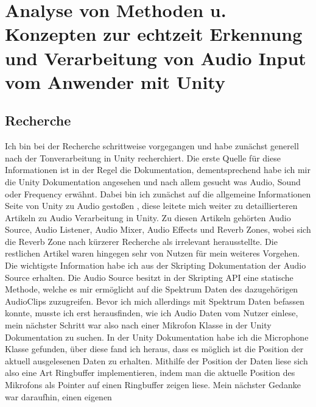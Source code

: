 \section{Analyse von Methoden u. Konzepten zur echtzeit Erkennung und Verarbeitung von Audio Input vom Anwender mit Unity}

\subsection{Recherche}
Ich bin bei der Recherche schrittweise vorgegangen und habe zunächst generell nach der Tonverarbeitung in Unity recherchiert. Die erste Quelle für diese Informationen ist in der Regel die Dokumentation, dementsprechend habe ich mir
die Unity Dokumentation angesehen und nach allem gesucht was Audio, Sound oder Frequency erwähnt. Dabei bin ich zunächst auf die allgemeine Informationen Seite von Unity zu Audio gestoßen \cite{unity_doku_audio}, diese leitete mich weiter zu detaillierteren Artikeln zu Audio Verarbeitung in Unity.
Zu diesen Artikeln gehörten Audio Source, Audio Listener, Audio Mixer, Audio Effects und Reverb Zones, wobei sich die Reverb Zone nach kürzerer
Recherche als irrelevant herausstellte. Die restlichen Artikel waren hingegen sehr von Nutzen für mein weiteres Vorgehen. Die wichtigste Information habe ich aus der Skripting Dokumentation der Audio Source erhalten. Die Audio Source besitzt
in der Skripting API eine statische Methode, welche es mir ermöglicht auf die Spektrum Daten des dazugehörigen AudioClips zuzugreifen. Bevor ich mich allerdings
mit Spektrum Daten befassen konnte, musste ich erst herausfinden, wie ich Audio Daten vom Nutzer einlese, mein nächster Schritt war also nach einer Mikrofon Klasse in der Unity Dokumentation zu suchen.
In der Unity Dokumentation habe ich die Microphone Klasse gefunden, über diese fand ich heraus, dass es möglich ist die Position der aktuell ausgelesenen Daten zu erhalten.
Mithilfe der Position der Daten liese sich also eine Art Ringbuffer implementieren, indem man die aktuelle Position des Mikrofons als Pointer auf einen Ringbuffer zeigen liese. Mein nächster Gedanke war daraufhin, einen eigenen
